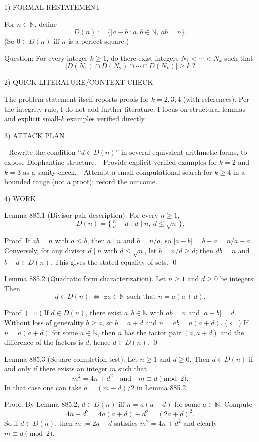 1) FORMAL RESTATEMENT

For $n\in\mathbb N$, define
\[D(n):=\{ |a-b| : a,b\in\mathbb N,\ ab=n\}.
\]
(So $0\in D(n)$ iff $n$ is a perfect square.)

Question: For every integer $k\ge 1$, do there exist integers $N_1<\cdots<N_k$ such that
\[\big|D(N_1)\cap D(N_2)\cap\cdots\cap D(N_k)\big|\ge k\ ?\]

2) QUICK LITERATURE/CONTEXT CHECK

The problem statement itself reports proofs for $k=2,3,4$ (with references). Per the integrity rule, I do not add further literature. I focus on structural lemmas and explicit small-$k$ examples verified directly.

3) ATTACK PLAN

- Rewrite the condition “$d\in D(n)$” in several equivalent arithmetic forms, to expose Diophantine structure.
- Provide explicit verified examples for $k=2$ and $k=3$ as a sanity check.
- Attempt a small computational search for $k\ge 4$ in a bounded range (not a proof); record the outcome.

4) WORK

Lemma 885.1 (Divisor-pair description).
For every $n\ge 1$,
\[D(n)=\{\,\tfrac{n}{d}-d\ :\ d\mid n,\ d\le \sqrt n\,\}.
\]

Proof.
If $ab=n$ with $a\le b$, then $a\mid n$ and $b=n/a$, so $|a-b|=b-a=n/a-a$.
Conversely, for any divisor $d\mid n$ with $d\le \sqrt n$, let $b=n/d\ge d$; then $db=n$ and $b-d\in D(n)$.
This gives the stated equality of sets. \qed

Lemma 885.2 (Quadratic form characterization).
Let $n\ge 1$ and $d\ge 0$ be integers. Then
\[d\in D(n)\ \Longleftrightarrow\ \exists a\in\mathbb N\text{ such that }n=a(a+d).
\]

Proof.
($\Rightarrow$) If $d\in D(n)$, there exist $a,b\in\mathbb N$ with $ab=n$ and $|a-b|=d$. Without loss of generality $b\ge a$, so $b=a+d$ and $n=ab=a(a+d)$.
($\Leftarrow$) If $n=a(a+d)$ for some $a\in\mathbb N$, then $n$ has the factor pair $(a,a+d)$ and the difference of the factors is $d$, hence $d\in D(n)$.
\qed

Lemma 885.3 (Square-completion test).
Let $n\ge 1$ and $d\ge 0$. Then $d\in D(n)$ if and only if there exists an integer $m$ such that
\[m^2=4n+d^2\quad\text{and}\quad m\equiv d\pmod 2.
\]
In that case one can take $a=(m-d)/2$ in Lemma 885.2.

Proof.
By Lemma 885.2, $d\in D(n)$ iff $n=a(a+d)$ for some $a\in\mathbb N$.
Compute
\[4n+d^2=4a(a+d)+d^2=(2a+d)^2.
\]
So if $d\in D(n)$, then $m:=2a+d$ satisfies $m^2=4n+d^2$ and clearly $m\equiv d\pmod 2$.


